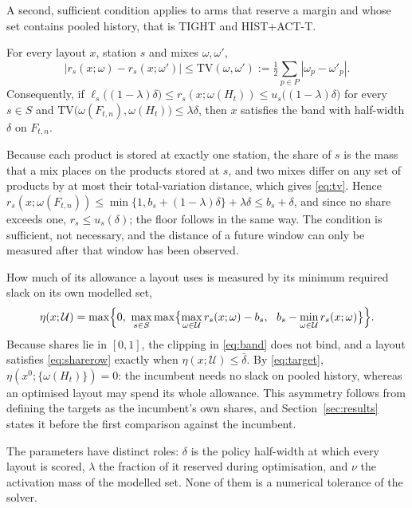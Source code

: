 A second, sufficient condition applies to arms that reserve a margin and whose set contains pooled history, that is TIGHT and HIST+ACT-T.

\begin{proposition}
For every layout $x$, station $s$ and mixes $\omega,\omega'$,
\begin{equation}
\bigl|r_s(x;\omega)-r_s(x;\omega')\bigr|\le\mathrm{TV}(\omega,\omega'):=\tfrac12\sum_{p\in P}|\omega_p-\omega'_p|. \label{eq:tv}
\end{equation}
Consequently, if $\ell_s\bigl((1-\lambda)\delta\bigr)\le r_s(x;\omega(H_t))\le u_s\bigl((1-\lambda)\delta\bigr)$ for every $s\in S$ and $\mathrm{TV}\bigl(\omega(F_{t,n}),\omega(H_t)\bigr)\le\lambda\delta$, then $x$ satisfies the band with half-width $\delta$ on $F_{t,n}$.
\end{proposition}

Because each product is stored at exactly one station, the share of $s$ is the mass that a mix places on the products stored at $s$, and two mixes differ on any set of products by at most their total-variation distance, which gives \eqref{eq:tv}. Hence $r_s(x;\omega(F_{t,n}))\le\min\{1,b_s+(1-\lambda)\delta\}+\lambda\delta\le b_s+\delta$, and since no share exceeds one, $r_s\le u_s(\delta)$; the floor follows in the same way. The condition is sufficient, not necessary, and the distance of a future window can only be measured after that window has been observed.

How much of its allowance a layout uses is measured by its minimum required slack on its own modelled set,
\begin{equation}
\eta(x;\mathcal U)=\max\Bigl\{0,\ \max_{s\in S}\max\bigl\{\max_{\omega\in\mathcal U}r_s(x;\omega)-b_s,\ \ b_s-\min_{\omega\in\mathcal U}r_s(x;\omega)\bigr\}\Bigr\}. \label{eq:slack}
\end{equation}
Because shares lie in $[0,1]$, the clipping in \eqref{eq:band} does not bind, and a layout satisfies \eqref{eq:sharerow} exactly when $\eta(x;\mathcal U)\le\bar\delta$. By \eqref{eq:target}, $\eta(x^0;\{\omega(H_t)\})=0$: the incumbent needs no slack on pooled history, whereas an optimised layout may spend its whole allowance. This asymmetry follows from defining the targets as the incumbent's own shares, and Section~\ref{sec:results} states it before the first comparison against the incumbent.

The parameters have distinct roles: $\delta$ is the policy half-width at which every layout is scored, $\lambda$ the fraction of it reserved during optimisation, and $\nu$ the activation mass of the modelled set. None of them is a numerical tolerance of the solver.
